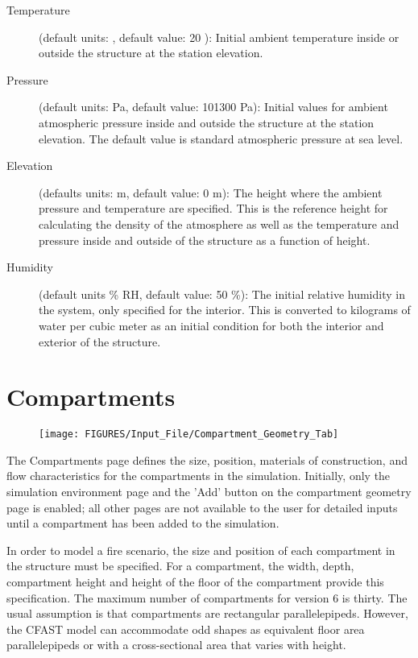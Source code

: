 \begin{description}
\item[Temperature] (default units: \degc, default value: 20 \degc): Initial ambient temperature inside or outside the structure at the station elevation.

\item[Pressure] (default units: Pa, default value: 101300 Pa): Initial values for ambient atmospheric pressure inside and outside the structure at the station elevation. The default value is standard atmospheric pressure at sea level.

\item[Elevation] (defaults units: m, default value: 0 m): The height where the ambient pressure and temperature are specified.  This is the reference height for calculating the density of the atmosphere as well as the temperature and pressure inside and outside of the structure as a function of height.

\item[Humidity] (default units \% RH, default value: 50 \%): The initial relative humidity in the system, only specified for the interior.  This is converted to kilograms of water per cubic meter as an initial condition for both the interior and exterior of the structure.
\end{description}






\chapter{Compartments}

\begin{figure}[h!]
\begin{center}
\texttt{[image: FIGURES/Input\_File/Compartment\_Geometry\_Tab]}
\end{center}
\end{figure}

The Compartments page defines the size, position, materials of construction, and flow characteristics for the compartments in the simulation. Initially, only the simulation environment page and the 'Add' button on the compartment geometry page is enabled; all other pages are not available to the user for detailed inputs until a compartment has been added to the simulation.

In order to model a fire scenario, the size and position of each compartment in the structure must be specified. For a compartment, the width, depth, compartment height and height of the floor of the compartment provide this specification. The maximum number of compartments for version 6 is thirty. The usual assumption is that compartments are rectangular parallelepipeds. However, the CFAST model can accommodate odd shapes as equivalent floor area parallelepipeds or with a cross-sectional area that varies with height.

